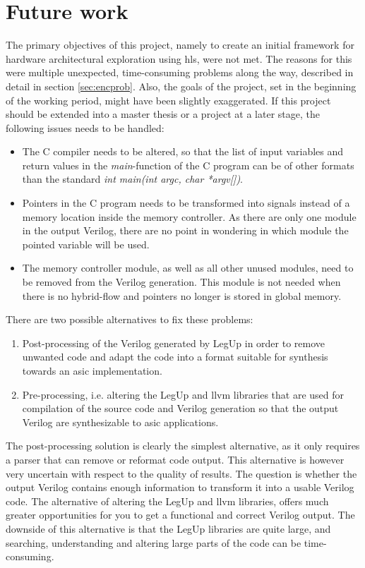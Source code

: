 \chapter{Future work}
\label{chp:futurework} 
The primary objectives of this project, namely to create an initial framework for hardware architectural exploration using \gls{hls}, were not met. The reasons for this were multiple unexpected, time-consuming problems along the way, described in detail in section \ref{sec:encprob}. Also, the goals of the project, set in the beginning of the working period, might have been slightly exaggerated.
If this project should be extended into a master thesis or a project at a later stage, the following issues needs to be handled:
\begin{itemize}
\item The C compiler needs to be altered, so that the list of input variables and return values in the \textit{main}-function of the C program can be of other formats than the standard \textit{int main(int argc, char *argv[])}.
\item Pointers in the C program needs to be transformed into signals instead of a memory location inside the memory controller. As there are only one module in the output Verilog, there are no point in wondering in which module the pointed variable will be used. 
\item The memory controller module, as well as all other unused modules, need to be removed from the Verilog generation. This module is not needed when there is no hybrid-flow and pointers no longer is stored in global memory.
\end{itemize}

There are two possible alternatives to fix these problems:
\begin{enumerate}
\item Post-processing of the Verilog generated by LegUp in order to remove unwanted code and adapt the code into a format suitable for synthesis towards an \gls{asic} implementation.
\item Pre-processing, i.e. altering the LegUp and \gls{llvm} libraries that are used for compilation of the source code and Verilog generation so that the output Verilog are synthesizable to \gls{asic} applications.
\end{enumerate}

The post-processing solution is clearly the simplest alternative, as it only requires a parser that can remove or reformat code output. This alternative is however very uncertain with respect to the quality of results. The question is whether the output Verilog contains enough information to transform it into a usable Verilog code.
The alternative of altering the LegUp and \gls{llvm} libraries, offers much greater opportunities for you to get a functional and correct Verilog output. The downside of this alternative is that the LegUp libraries are quite large, and searching, understanding and altering large parts of the code can be time-consuming. 